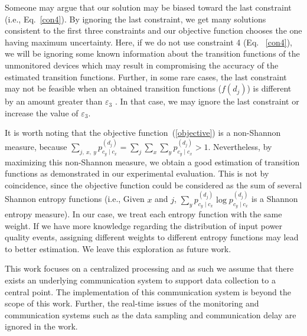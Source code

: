 \begin{remark}
Someone may argue that our solution may be biased toward the last constraint (i.e., Eq.~\ref{con4}). By ignoring the last constraint, we get many solutions consistent to the first three constraints and our objective function chooses the one having maximum uncertainty. Here, if we do not use constraint 4 (Eq. ~\ref{con4}), we will be ignoring some known information about the transition functions of the unmonitored devices which may result in compromising the accuracy of the estimated transition functions. Further, in some rare cases, the last constraint may not be feasible when an obtained transition functions ($f(d_j)$) is different by an amount greater than $\varepsilon_3$ . In that case, we may ignore the last constraint or increase the value of $\varepsilon_3$.
\end{remark}

\begin{remark}
It is worth noting that the objective function~(\ref{objective}) is a non-Shannon measure, because $\sum_{j, ~x, ~y} p_{c_y \mid c_x}^{(d_j)} = \sum_{j}\sum_{x}\sum_{y} p_{c_y \mid c_x}^{(d_j)} >1$. Nevertheless, by maximizing this non-Shannon measure, we obtain a good estimation of transition functions as demonstrated in our experimental evaluation. This is not by coincidence, since the objective function could be considered as the sum of several Shannon entropy functions (i.e., Given $x$ and $j$, $\sum_{y} p_{c_y \mid c_x}^{(d_j)}\log p_{c_y \mid c_x}^{(d_j)}$ is a Shannon entropy measure). In our case, we treat each entropy function with the same weight. If we have more knowledge regarding the distribution of input power quality events, assigning different weights to different entropy functions may lead to better estimation. We leave this exploration as future work.  \end{remark}

\begin{remark}
This work focuses on a centralized processing and as such we assume that there exists an underlying communication system to support data collection to a central point. The implementation of this communication system is beyond the scope of this work. Further, the real-time issues of the monitoring and communication systems such as the data sampling and communication delay are ignored in the work.
\end{remark}

